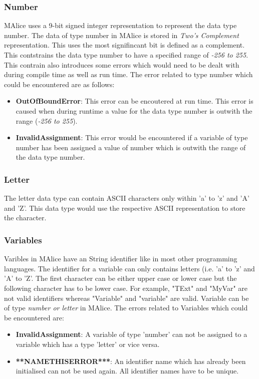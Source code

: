\documentclass[a4wide, 11pt]{article}
\begin{document}
		\subsubsection{Number}
			\label{sec:num}
			MAlice uses a 9-bit signed integer representation to represent the data type number. The data of type
			number in MAlice is stored in \emph{Two's Complement} representation. This uses the most signifincant
			bit is defined as a complement. 
			This contstrains the data type number to have a specified range of \emph{-256 to 255}. This
			contrain also introduces some errors which would need to be dealt with during compile time as
			well as run time. The error related to type number which could be encountered are as follows:
			\begin{itemize}
				\item {\bf OutOfBoundError}: This error can be encoutered at run time. 
							This error is caused when during
							runtime a value for the data type number is outwith the range (\emph{-256 to 255}).
				\item {\bf InvalidAssignment}: This error would be encountered if a 
							variable of type number has been assigned a value of number which is 
							outwith the range of the data type number. 
			\end{itemize}
	
	\subsubsection{Letter}
		\label{sec:letter}
			The letter data type can contain ASCII characters only within 'a' to 'z' and 'A' and 'Z'.
			This data type would use the respective ASCII representation to store the character.

	\subsubsection{Variables}
		\label{sec:var}
			Varibles in MAlice have an String identifier like in most other programming languages.
			The identifier for a variable can only contains letters (i.e. 'a' to 'z' and 'A' to 'Z'.
			The first character can be either upper case or lower case but the following character has to be
			lower case. For example, "TExt" and "MyVar" are not valid identifiers whereas "Variable" and
			"variable" are valid. Variable can be of type 
			\emph{number or letter} in MAlice. The errors related to Variables which could be encountered are:
			\begin{itemize}
				\item {\bf InvalidAssignment}: A variable of type 'number' can not be assigned to a variable which
					has a type 'letter' or vice versa.
				\item {\bf ***NAMETHISERROR***}: An identifier name which has already been initialised can not
					be used again. All identifier names have to be unique.
			\end{itemize}
	
\end{document}
